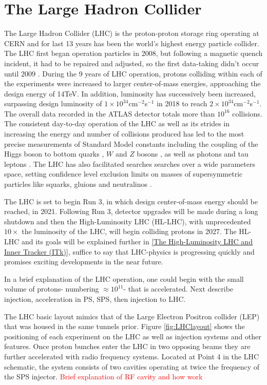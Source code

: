 \section{The Large Hadron Collider}
The Large Hadron Collider (LHC) is the proton-proton storage ring operating at CERN and for last 13 years has been the world's highest energy particle collider. The LHC first began operation particles in 2008, but following a magnetic quench incident, it had to be repaired and adjusted, so the first data-taking didn't occur until 2009 \cite{Rossi_2010}. During the 9 years of LHC operation, protons colliding within each of the experiments were increased to larger center-of-mass energies, approaching the design energy of 14TeV. In addition, luminosity has successively been increased, surpassing design luminosity of $1\times10^{34}$cm$^{-2}$s$^{-1}$ in 2018 to reach $2\times10^{34}$cm$^{-2}$s$^{-1}$\cite{CERNnews1}. The overall data recorded in the ATLAS detector totals more than $10^{16}$ collisions. The consistent day-to-day operation of the LHC as well as its strides in increasing the energy and number of collisions produced has led to the most precise measurements of Standard Model constants including the coupling of the Higgs boson to bottom quarks \cite{Aabout_2018_0}, $W$ and $Z$ bosons \cite{Aaboud_2019}, \cite{Aaboud_2018} as well as photons\cite{Aaboud_2018_2} and tau leptons \cite{Aaboud_2019_2}. The LHC has also facilitated searches searches over a wide parameters space, setting confidence level exclusion limits on masses of supersymmetric particles like squarks, gluions and neutralinos \cite{ATLAS-CONF-2019-040}. 

The LHC is set to begin Run 3, in which design center-of-mass energy should be reached, in 2021. Following Run 3, detector upgrades will be made during a long shutdown and then the High-Luminosity LHC (HL-LHC), with unprecedented $10\times$ the luminosity of the LHC, will begin colliding protons in 2027\cite{CERNnews2}. The HL-LHC and its goals will be explained further in \ref{The High-Luminosity LHC and Inner Tracker (ITk)}, suffice to say that LHC-physics is progressing quickly and promises exciting developments in the near future. 

In a brief explanation of the LHC operation, one could begin with the small volume of protons- numbering $\approx 10^{11}$- that is accelerated. Next describe injection, acceleration in PS, SPS, then injection to LHC. 

The LHC basic layout mimics that of the Large Electron Positron collider (LEP) that was housed in the same tunnels prior. Figure \ref{fig:LHClayout} shows the positioning of each experiment on the LHC as well as injection systems and other features. Once proton bunches enter the LHC in two opposing beams they are further accelerated with radio frequency systems. Located at Point 4 in the LHC schematic, the system consists of two cavities operating at twice the frequency of the SPS injector. \textcolor{red}{Brief explanation of RF cavity and how work} 

